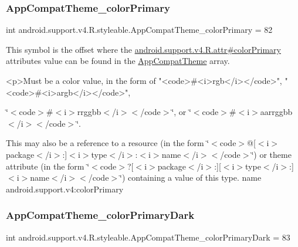 \subsubsection{\texorpdfstring{App\+Compat\+Theme\+\_\+color\+Primary}{AppCompatTheme\_colorPrimary}}
{\footnotesize\ttfamily int android.\+support.\+v4.\+R.\+styleable.\+App\+Compat\+Theme\+\_\+color\+Primary = 82\hspace{0.3cm}{\ttfamily [static]}}

This symbol is the offset where the \hyperlink{classandroid_1_1support_1_1v4_1_1R_1_1attr_af2f3bec0516073795645916be3a7eca5}{android.\+support.\+v4.\+R.\+attr\#color\+Primary} attribute\textquotesingle{}s value can be found in the \hyperlink{classandroid_1_1support_1_1v4_1_1R_1_1styleable_ac07ebbe62ed977f6dcaadc6397840ace}{App\+Compat\+Theme} array.

\begin{DoxyVerb}      <p>Must be a color value, in the form of "<code>#<i>rgb</i></code>", "<code>#<i>argb</i></code>",
\end{DoxyVerb}
 \char`\"{}$<$code$>$\#$<$i$>$rrggbb$<$/i$>$$<$/code$>$\char`\"{}, or \char`\"{}$<$code$>$\#$<$i$>$aarrggbb$<$/i$>$$<$/code$>$\char`\"{}. 

This may also be a reference to a resource (in the form \char`\"{}$<$code$>$@\mbox{[}$<$i$>$package$<$/i$>$\+:\mbox{]}$<$i$>$type$<$/i$>$\+:$<$i$>$name$<$/i$>$$<$/code$>$\char`\"{}) or theme attribute (in the form \char`\"{}$<$code$>$?\mbox{[}$<$i$>$package$<$/i$>$\+:\mbox{]}\mbox{[}$<$i$>$type$<$/i$>$\+:\mbox{]}$<$i$>$name$<$/i$>$$<$/code$>$\char`\"{}) containing a value of this type.  name android.\+support.\+v4\+:color\+Primary \mbox{\label{classandroid_1_1support_1_1v4_1_1R_1_1styleable_a86a4e758d00bd09c64f8125e28a09831}} 
\subsubsection{\texorpdfstring{App\+Compat\+Theme\+\_\+color\+Primary\+Dark}{AppCompatTheme\_colorPrimaryDark}}
{\footnotesize\ttfamily int android.\+support.\+v4.\+R.\+styleable.\+App\+Compat\+Theme\+\_\+color\+Primary\+Dark = 83\hspace{0.3cm}{\ttfamily [static]}}

